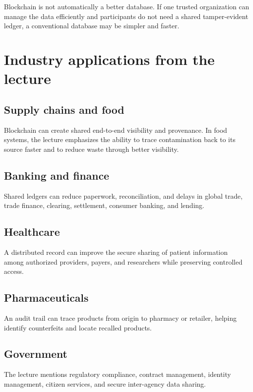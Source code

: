 \begin{pitfall}
Blockchain is not automatically a better database. If one trusted organization can manage the data efficiently and participants do not need a shared tamper-evident ledger, a conventional database may be simpler and faster.
\end{pitfall}

\section{Industry applications from the lecture}

\subsection{Supply chains and food}

Blockchain can create shared end-to-end visibility and provenance. In food systems, the lecture emphasizes the ability to trace contamination back to its source faster and to reduce waste through better visibility.

\subsection{Banking and finance}

Shared ledgers can reduce paperwork, reconciliation, and delays in global trade, trade finance, clearing, settlement, consumer banking, and lending.

\subsection{Healthcare}

A distributed record can improve the secure sharing of patient information among authorized providers, payers, and researchers while preserving controlled access.

\subsection{Pharmaceuticals}

An audit trail can trace products from origin to pharmacy or retailer, helping identify counterfeits and locate recalled products.

\subsection{Government}

The lecture mentions regulatory compliance, contract management, identity management, citizen services, and secure inter-agency data sharing.

